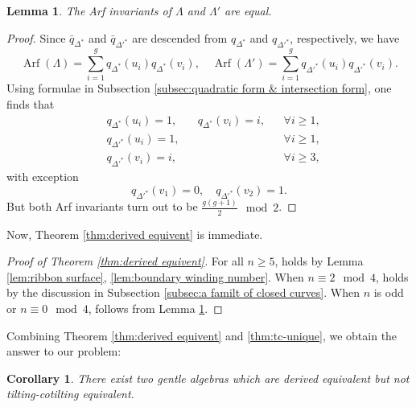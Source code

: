 \documentclass[11pt,reqno]{amsart}
\theoremstyle{plain}
\newtheorem{lemma}[theorem]{Lemma}
\newtheorem{corollary}[theorem]{Corollary}
\theoremstyle{definition}
\theoremstyle{remark}
\numberwithin{equation}{section}
\begin{document}
\begin{lemma}\label{lem:Arf invariant}
    The Arf invariants of $\Lambda$ and $\Lambda'$ are equal.
\end{lemma}
\begin{proof}
    \par Since $\bar q_{\Delta^*}$ and $\bar q_{\Delta'^*}$ are descended from $q_{\Delta^*}$ and $q_{\Delta'^*}$, respectively, we have
    \[\mathop{\mathrm{Arf}}(\Lambda)=\sum_{i=1}^gq_{\Delta^*}(u_i)q_{\Delta^*}(v_i),\quad
    \mathop{\mathrm{Arf}}(\Lambda')=\sum_{i=1}^gq_{\Delta'^*}(u_i)q_{\Delta'^*}(v_i).\]
    Using formulae in Subsection \ref{subsec:quadratic form & intersection form}, one finds that
    \[\begin{aligned}
        &q_{\Delta^*}(u_i)=1,&&q_{\Delta^*}(v_i)=i,&&\forall i\geq1,\\
        &q_{\Delta'^*}(u_i)=1,&& &&\forall i\geq1,\\
        &q_{\Delta'^*}(v_i)=i,&& &&\forall i\geq3,
    \end{aligned}\]
    with exception
    \[q_{\Delta'^*}(v_1)=0,\quad q_{\Delta'^*}(v_2)=1.\]
    But both Arf invariants turn out to be $\frac{g(g+1)}{2}\mod2$.
\end{proof}
\par Now, Theorem \ref{thm:derived equivent} is immediate.
\begin{proof}[Proof of Theorem \ref{thm:derived equivent}]
    For all $n\geq5$, \cite[Theorem 7.4(1)(2)]{APS} holds by Lemma \ref{lem:ribbon surface}, \ref{lem:boundary winding number}. When $n\equiv2\mod4$, \cite[Theorem 7.4(3)(b)(ii)]{APS} holds by the discussion in Subsection \ref{subsec:a familt of closed curves}. When $n$ is odd or $n\equiv0\mod4$, \cite[Theorem 7.4(3)(b)(iii)]{APS} follows from Lemma \ref{lem:Arf invariant}.
\end{proof}

\par Combining Theorem \ref{thm:derived equivent} and \ref{thm:tc-unique}, we obtain the answer to our problem:
\begin{corollary}
    There exist two gentle algebras which are derived equivalent but not tilting-cotilting equivalent.
\end{corollary}
\end{document}
